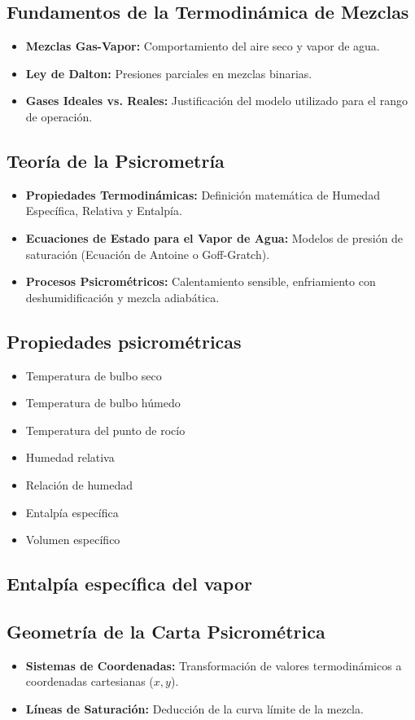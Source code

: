 \subsection{Fundamentos de la Termodinámica de Mezclas}
\begin{itemize}
    \item \textbf{Mezclas Gas-Vapor:} Comportamiento del aire seco y vapor de agua.
    \item \textbf{Ley de Dalton:} Presiones parciales en mezclas binarias.
    \item \textbf{Gases Ideales vs. Reales:} Justificación del modelo utilizado para el rango de operación.
\end{itemize}

\subsection{Teoría de la Psicrometría}
    \begin{itemize}
        \item \textbf{Propiedades Termodinámicas:} Definición matemática de Humedad Específica, Relativa y Entalpía.
        \item \textbf{Ecuaciones de Estado para el Vapor de Agua:} Modelos de presión de saturación (Ecuación de Antoine o Goff-Gratch).
        \item \textbf{Procesos Psicrométricos:} Calentamiento sensible, enfriamiento con deshumidificación y mezcla adiabática.
    \end{itemize}

    \subsection{Propiedades psicrométricas}
        \begin{itemize}
            \item Temperatura de bulbo seco
            \item Temperatura de bulbo húmedo
            \item Temperatura del punto de rocío
            \item Humedad relativa
            \item Relación de humedad
            \item Entalpía específica
            \item Volumen específico
        \end{itemize}




    \subsection{Entalpía específica del vapor}
        

\subsection{Geometría de la Carta Psicrométrica}
\begin{itemize}
    \item \textbf{Sistemas de Coordenadas:} Transformación de valores termodinámicos a coordenadas cartesianas ($x, y$).
    \item \textbf{Líneas de Saturación:} Deducción de la curva límite de la mezcla.
\end{itemize}



